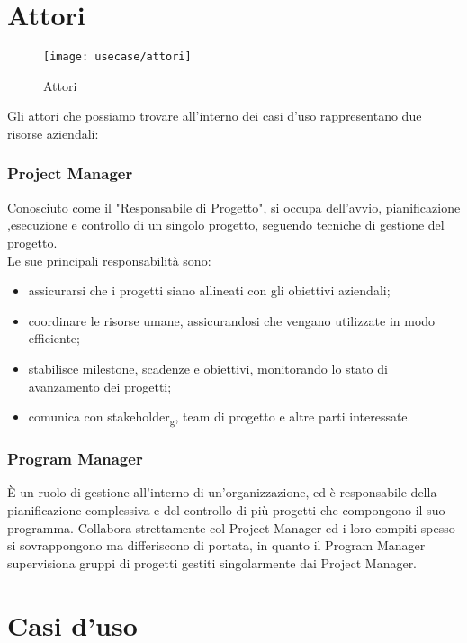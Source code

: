\section{Attori}
\begin{figure}[H] 
    \centering 
    \texttt{[image: usecase/attori]} 
    \caption{Attori}
\end{figure}
Gli attori che possiamo trovare all'interno dei casi d'uso rappresentano due risorse aziendali:
\subsubsection*{Project Manager}
Conosciuto come il "Responsabile di Progetto", si occupa dell'avvio, pianificazione ,esecuzione e controllo di un singolo progetto, seguendo tecniche di gestione del progetto.\\
Le sue principali responsabilità sono:
\begin{itemize}
\item assicurarsi che i progetti siano allineati con gli obiettivi aziendali;
\item coordinare le risorse umane, assicurandosi che vengano utilizzate in modo efficiente;
\item stabilisce milestone, scadenze e obiettivi, monitorando lo stato di avanzamento dei progetti;
\item comunica con stakeholder\textsubscript{g}, team di progetto e altre parti interessate.
\end{itemize}
\subsubsection*{Program Manager}
È un ruolo di gestione all'interno di un'organizzazione, ed è responsabile della pianificazione complessiva e del controllo di più progetti che compongono il suo programma. Collabora strettamente col Project Manager ed i loro compiti spesso si sovrappongono ma differiscono di portata, in quanto il Program Manager supervisiona gruppi di progetti gestiti singolarmente dai Project Manager.

\section{Casi d'uso}












 

